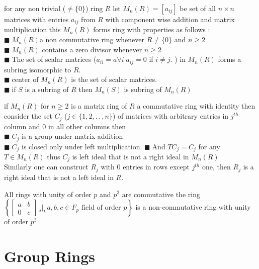 \documentclass[11pt]{extarticle}
\newcommand{\w}[1]{\text{#1}}
\newcommand{\ck}{.\,.\,}
\newcommand{\tm}{\times}
\newcommand{\snote}[1]{{\footnotesize(#1)}}
\newcommand{\st}{\,{}_{s}|_t\,}
\newcommand{\tbx}[2][]{
	\begin{tcolorbox}[enhanced,breakable,size=small,colback=black!2!white,title={#1},arc is angular, arc=1.5mm,drop fuzzy shadow]
		#2
	\end{tcolorbox}
}
\newcommand{\y}{$\blacksquare\;$}
\begin{document}
\begin{multicols}{2}
\tbx{for any non trivial \snote{$\neq \{0\} $} ring $ R $ let $ M_n(R) =[a_{ij}]$ be set of all $ n\tm n $ matrices with entries $ a_{ij} $ from $ R $ with component wise addition and matrix multiplication this $ M_n(R) $ forms ring with properties as follows :\\
\y $ M_n(R) $a non commutative ring whenever $ R\neq \{0\} $ and $ n\geq 2 $\\
\y $ M_n(R) $ contains a zero divisor whenever $ n\geq 2 $\\
\y The set of scalar matrices \snote{$ a_{ii}=a \forall i\; a_{ij}=0 $ if $ i\neq j. $ } in $ M_n(R)$ forms a subring isomorphic to $ R .$\\
\y center of $ M_n(R) $ is the set of scalar matrices.\\
\y if $ S $ is a subring of $ R $ then $ M_n(S) $ is subring of $ M_n(R) $}
\tbx{ if $ M_n(R) $ for $ n\geq 2 $ is a matrix ring of $ R $ a commutative ring with identity then consider the set $ C_j $  \snote{$ j\in \{1,2,\ck , n\} $} of matrices with arbitrary entries in $ j^{th} $ column and $ 0 $ in all other columns then \\
\y $ C_j $ is a group under matrix addition\\
\y $ C_j $ is closed only under left multiplication.
\y And $TC_j=C_j  $ for any $ T\in M_n(R) $ thus $ C_j $ is left ideal that is not a right ideal in $ M_n(R) $\\
Similarly one can construct $ R_j $ with $ 0 $ entries in rows except $ j^{th} $ one, then $ R_j $ is a right ideal that is not a left ideal in $ R $.}
\tbx{ All rings with unity of order $ p $ and $ p^2 $ are commutative the ring $ \left\lbrace\begin{bmatrix}
		a&b\\
		0&c
	\end{bmatrix}\st a,b,c\in F_p  \w{ field of order } p\right\rbrace$ is a non-commutative ring with unity of order $ p^3 $  }

\section{Group Rings}


\end{multicols}
\end{document}
